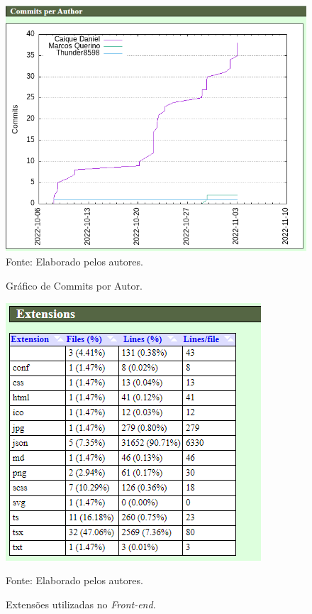 \documentclass[
    12pt,               %
    openright,          %
    oneside,
    a4paper,            %
    BIBLATEX,           %
    TODO,               %
    english,            %
    brazil              %
    ]{ifsp-spo-inf-ctds}
\begin{document}
        \begin{figure}[H]
                \centering
                \caption{Gráfico de Commits por Autor.}
                \includegraphics[width=1 \textwidth]{Gitstats/front-end/CommitsPorAutor.png}
                {\footnotesize Fonte: Elaborado pelos autores.}
                \label{fig:commitFront}
        \end{figure}   

        \begin{figure}[H]
                \centering
                \caption{Extensões utilizadas no \emph{Front-end}.}
                \includegraphics[scale = 1.2]{Gitstats/front-end/ListadeExtensoes.png}
                
                {\footnotesize Fonte: Elaborado pelos autores.}
                \label{fig:extensaoFront}
        \end{figure}  
\end{document}
